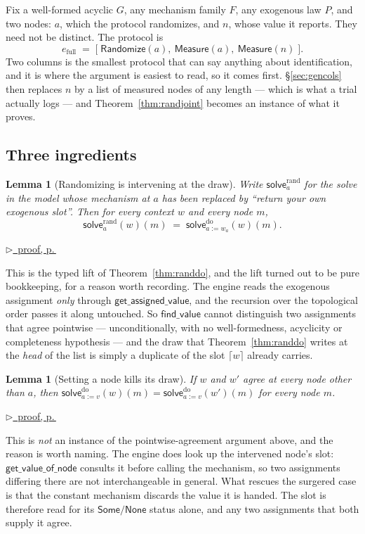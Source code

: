 \documentclass[11pt,a4paper]{article}
\theoremstyle{definition}
\theoremstyle{plain}
\newtheorem{lemma}[definition]{Lemma}
\theoremstyle{remark}
\newcommand{\solve}{\mathsf{solve}}
\newcommand{\solvedo}{\solve^{\mathrm{do}}}
\newcommand{\fv}{\mathsf{find\_value}}
\newcommand{\pfref}[1]{%
  \par\smallskip\noindent
  \hyperref[pf:#1]{\small$\triangleright$\ proof, p.\,\pageref{pf:#1}}\par\smallskip}
\begin{document}
Fix a well-formed acyclic $G$, any mechanism family $F$, any exogenous law
$P$, and two nodes: $a$, which the protocol randomizes, and $n$, whose
value it reports. They need not be distinct. The protocol is
\[
  e_{\mathrm{full}} \;=\;
  \bigl[\;\mathsf{Randomize}(a),\ \mathsf{Measure}(a),\ \mathsf{Measure}(n)\;\bigr].
\]
Two columns is the smallest protocol that can say anything about
identification, and it is where the argument is easiest to read, so it
comes first. \S\ref{sec:gencols} then replaces $n$ by a list of measured
nodes of any length --- which is what a trial actually logs --- and
Theorem~\ref{thm:randjoint} becomes an instance of what it proves.

\subsection{Three ingredients}
\label{sec:genparts}

\begin{lemma}[Randomizing is intervening at the draw]
\label{lem:solverand}
Write $\solve^{\mathrm{rand}}_a$ for the solve in the model whose
mechanism at $a$ has been replaced by ``return your own exogenous slot''.
Then for every context $w$ and every node $m$,
\[
  \solve^{\mathrm{rand}}_a(w)(m) \;=\; \solvedo_{a := w_a}(w)(m) .
\]
\end{lemma}

\pfref{lem:solverand}

This is the typed lift of Theorem~\ref{thm:randdo}, and the lift turned
out to be pure bookkeeping, for a reason worth recording. The engine
reads the exogenous assignment \emph{only} through
$\mathsf{get\_assigned\_value}$, and the recursion over the topological
order passes it along untouched. So $\fv$ cannot distinguish two
assignments that agree pointwise --- unconditionally, with no
well-formedness, acyclicity or completeness hypothesis --- and the draw
that Theorem~\ref{thm:randdo} writes at the \emph{head} of the list is
simply a duplicate of the slot $\lceil w \rceil$ already carries.

\begin{lemma}[Setting a node kills its draw]
\label{lem:solvedooff}
If $w$ and $w'$ agree at every node other than $a$, then
$\solvedo_{a := v}(w)(m) = \solvedo_{a := v}(w')(m)$ for every node $m$.
\end{lemma}

\pfref{lem:solvedooff}

This is \emph{not} an instance of the pointwise-agreement argument above,
and the reason is worth naming. The engine does look up the intervened
node's slot: $\mathsf{get\_value\_of\_node}$ consults it before calling
the mechanism, so two assignments differing there are not interchangeable
in general. What rescues the surgered case is that the constant mechanism
discards the value it is handed. The slot is therefore read for its
$\mathsf{Some}/\mathsf{None}$ status alone, and any two assignments that
both supply it agree.
\end{document}
